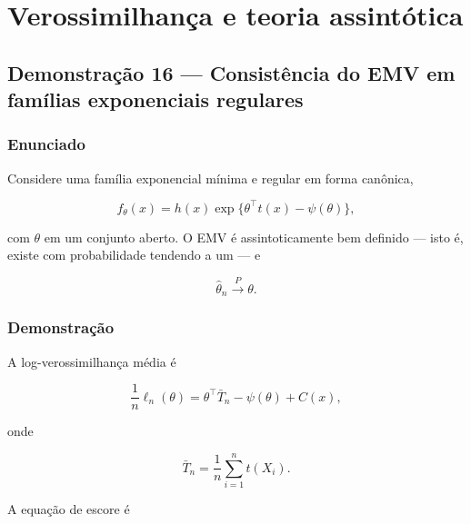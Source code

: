 \documentclass[
  letterpaper,
  DIV=11,
  numbers=noendperiod]{scrreprt}
\begin{document}

\chapter*{Verossimilhança e teoria
assintótica}\label{verossimilhanuxe7a-e-teoria-assintuxf3tica}


\section*{Demonstração 16 --- Consistência do EMV em famílias
exponenciais
regulares}\label{demonstrauxe7uxe3o-16-consistuxeancia-do-emv-em-famuxedlias-exponenciais-regulares}


\subsection*{Enunciado}\label{enunciado-11}

Considere uma família exponencial mínima e regular em forma canônica,

\[
f_\theta(x)=h(x)\exp\{\theta^\top t(x)-\psi(\theta)\},
\]

com \(\theta\) em um conjunto aberto. O EMV é assintoticamente bem
definido --- isto é, existe com probabilidade tendendo a um --- e

\[
\widehat\theta_n\xrightarrow{P}\theta.
\]

\subsection*{Demonstração}\label{demonstrauxe7uxe3o-12}

A log-verossimilhança média é

\[
\frac{1}{n}\ell_n(\theta)
=
\theta^\top\bar T_n-\psi(\theta)+C(x),
\]

onde

\[
\bar T_n=\frac{1}{n}\sum_{i=1}^nt(X_i).
\]

A equação de escore é
\end{document}

